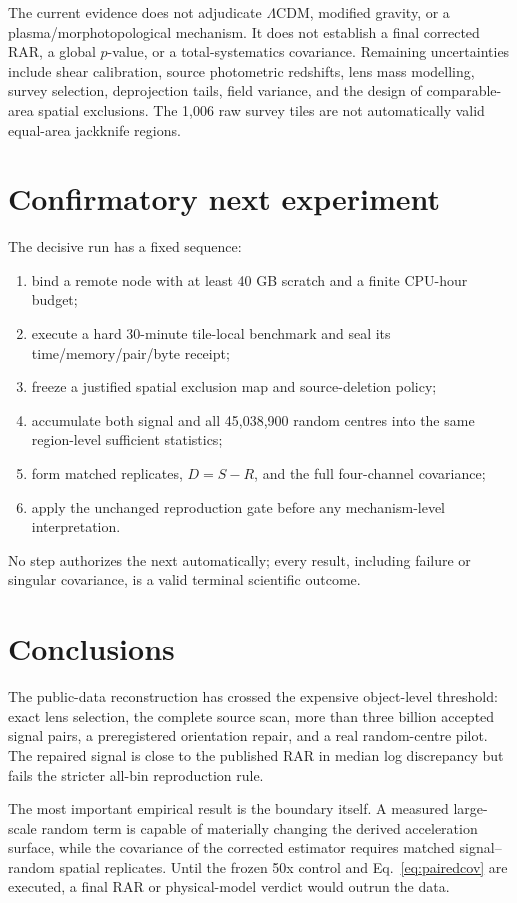 \documentclass[11pt]{article}
\begin{document}
The current evidence does not adjudicate $\Lambda$CDM, modified gravity, or a
plasma/morphotopological mechanism. It does not establish a final corrected
RAR, a global $p$-value, or a total-systematics covariance. Remaining
uncertainties include shear calibration, source photometric redshifts, lens
mass modelling, survey selection, deprojection tails, field variance, and the
design of comparable-area spatial exclusions. The 1,006 raw survey tiles are
not automatically valid equal-area jackknife regions.

\section{Confirmatory next experiment}

The decisive run has a fixed sequence:
\begin{enumerate}
\item bind a remote node with at least 40 GB scratch and a finite CPU-hour
budget;
\item execute a hard 30-minute tile-local benchmark and seal its
time/memory/pair/byte receipt;
\item freeze a justified spatial exclusion map and source-deletion policy;
\item accumulate both signal and all 45,038,900 random centres into the same
region-level sufficient statistics;
\item form matched replicates, $D=S-R$, and the full four-channel covariance;
\item apply the unchanged reproduction gate before any mechanism-level
interpretation.
\end{enumerate}
No step authorizes the next automatically; every result, including failure or
singular covariance, is a valid terminal scientific outcome.

\section{Conclusions}

The public-data reconstruction has crossed the expensive object-level
threshold: exact lens selection, the complete source scan, more than three
billion accepted signal pairs, a preregistered orientation repair, and a real
random-centre pilot. The repaired signal is close to the published RAR in
median log discrepancy but fails the stricter all-bin reproduction rule.

The most important empirical result is the boundary itself. A measured
large-scale random term is capable of materially changing the derived
acceleration surface, while the covariance of the corrected estimator requires
matched signal--random spatial replicates. Until the frozen 50x control and
Eq.~\eqref{eq:pairedcov} are executed, a final RAR or physical-model verdict
would outrun the data.
\end{document}
